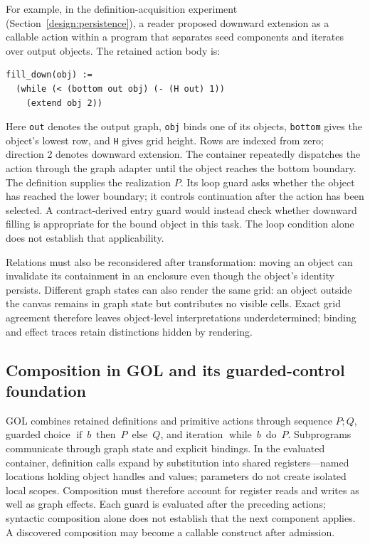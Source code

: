 \documentclass[11pt]{article}
\begin{document}
For example, in the definition-acquisition experiment (Section~\ref{design:persistence}), a reader proposed downward extension as a callable action within a program that separates seed components and iterates over output objects. The retained action body is:
\begin{verbatim}
fill_down(obj) :=
  (while (< (bottom out obj) (- (H out) 1))
    (extend obj 2))
\end{verbatim}
Here \texttt{out} denotes the output graph, \texttt{obj} binds one of its objects, \texttt{bottom} gives the object's lowest row, and \texttt{H} gives grid height. Rows are indexed from zero; direction 2 denotes downward extension. The container repeatedly dispatches the action through the graph adapter until the object reaches the bottom boundary. The definition supplies the realization $P$. Its loop guard asks whether the object has reached the lower boundary; it controls continuation after the action has been selected. A contract-derived entry guard would instead check whether downward filling is appropriate for the bound object in this task. The loop condition alone does not establish that applicability.

Relations must also be reconsidered after transformation: moving an object can invalidate its containment in an enclosure even though the object's identity persists. Different graph states can also render the same grid: an object outside the canvas remains in graph state but contributes no visible cells. Exact grid agreement therefore leaves object-level interpretations underdetermined; binding and effect traces retain distinctions hidden by rendering.

\subsection{Composition in GOL and its guarded-control foundation}\label{approach:composition}
GOL combines retained definitions and primitive actions through sequence $P;Q$, guarded choice $\mathop{\mathrm{if}}\ b\ \mathop{\mathrm{then}}\ P\ \mathop{\mathrm{else}}\ Q$, and iteration $\mathop{\mathrm{while}}\ b\ \mathop{\mathrm{do}}\ P$. Subprograms communicate through graph state and explicit bindings. In the evaluated container, definition calls expand by substitution into shared registers---named locations holding object handles and values; parameters do not create isolated local scopes. Composition must therefore account for register reads and writes as well as graph effects. Each guard is evaluated after the preceding actions; syntactic composition alone does not establish that the next component applies. A discovered composition may become a callable construct after admission.
\end{document}

